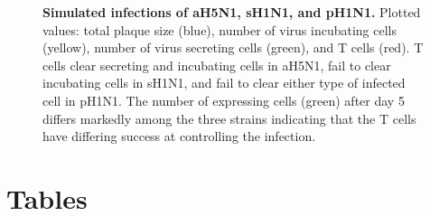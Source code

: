\documentclass[10pt]{article}
\begin{document}
\begin{figure}[!ht]
\begin{center}
 \end{center}
\caption{{\bf Simulated infections of aH5N1, sH1N1, and pH1N1.} Plotted values: total plaque size (blue), number of virus incubating cells (yellow), number of virus secreting cells (green), and T cells (red).  T cells clear secreting and incubating cells in aH5N1, fail to clear incubating cells in sH1N1, and fail to clear either type of infected cell in pH1N1.  The number of expressing cells (green) after day 5 differs markedly among the three strains indicating that the T cells have differing success at controlling the infection.} 
 \label{fig:plaquesize}
\end{figure}



\pagebreak

\section*{Tables}
\end{document}
